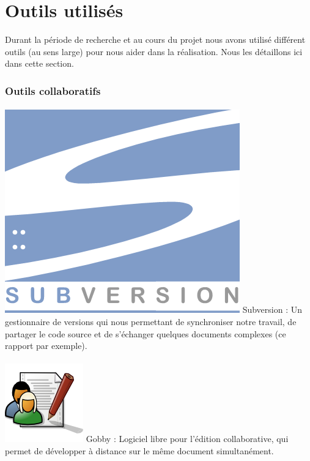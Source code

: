 \documentclass{report}
\begin{document}
		\section{Outils utilisés}
		Durant la période de recherche et au cours du projet nous avons utilisé différent outils (au sens large) pour nous aider dans la réalisation. Nous les détaillons ici dans cette section. \\
		
			\subsubsection{Outils collaboratifs}
			\paragraph{}
			\includegraphics[scale=1]{../logos/subversion-logo.png} 
			Subversion : Un gestionnaire de versions qui nous permettant de synchroniser notre travail, de partager le code source et de s'échanger quelques documents complexes (ce rapport par exemple).
			\paragraph{}
			\includegraphics[scale=0.25]{../logos/Gobby-logo.png} 
			Gobby :
			Logiciel libre pour l'édition collaborative, qui permet de développer à distance sur le même document simultanément. \\
\end{document}
